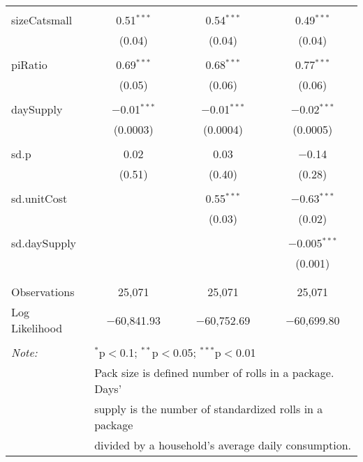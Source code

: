 \begin{table}[!htbp]
\begin{tabular}{@{\extracolsep{5pt}}lccc}
  & & & \\ 
 sizeCatsmall & 0.51$^{***}$ & 0.54$^{***}$ & 0.49$^{***}$ \\ 
  & (0.04) & (0.04) & (0.04) \\ 
  & & & \\ 
 piRatio & 0.69$^{***}$ & 0.68$^{***}$ & 0.77$^{***}$ \\ 
  & (0.05) & (0.06) & (0.06) \\ 
  & & & \\ 
 daySupply & $-$0.01$^{***}$ & $-$0.01$^{***}$ & $-$0.02$^{***}$ \\ 
  & (0.0003) & (0.0004) & (0.0005) \\ 
  & & & \\ 
 sd.p & 0.02 & 0.03 & $-$0.14 \\ 
  & (0.51) & (0.40) & (0.28) \\ 
  & & & \\ 
 sd.unitCost &  & 0.55$^{***}$ & $-$0.63$^{***}$ \\ 
  &  & (0.03) & (0.02) \\ 
  & & & \\ 
 sd.daySupply &  &  & $-$0.005$^{***}$ \\ 
  &  &  & (0.001) \\ 
  & & & \\ 
\hline \\[-1.8ex] 
Observations & 25,071 & 25,071 & 25,071 \\ 
Log Likelihood & $-$60,841.93 & $-$60,752.69 & $-$60,699.80 \\ 
\hline 
\hline \\[-1.8ex] 
\textit{Note:}  & \multicolumn{3}{l}{$^{*}$p$<$0.1; $^{**}$p$<$0.05; $^{***}$p$<$0.01} \\ 
 & \multicolumn{3}{l}{Pack size is defined number of rolls in a package. Days' } \\ 
 & \multicolumn{3}{l}{supply is the number of standardized rolls in a package} \\ 
 & \multicolumn{3}{l}{divided by a household's average daily consumption.} \\ 
\end{tabular} 
\end{table} 
